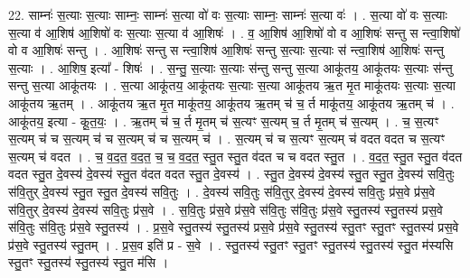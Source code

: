 \documentclass[17pt]{extarticle}
\begin{document}
22. साम्नः॑ स॒त्याः स॒त्याः साम्नः॒ साम्नः॑ स॒त्या वो॑ वः स॒त्याः साम्नः॒ साम्नः॑ स॒त्या वः॑ । . स॒त्या वो॑ वः स॒त्याः स॒त्या व॑ आ॒शिष॑ आ॒शिषो॑ वः स॒त्याः स॒त्या व॑ आ॒शिषः॑ । . व॒ आ॒शिष॑ आ॒शिषो॑ वो व आ॒शिषः॑ सन्तु स न्त्वा॒शिषो॑ वो व आ॒शिषः॑ सन्तु । . आ॒शिषः॑ सन्तु स न्त्वा॒शिष॑ आ॒शिषः॑ सन्तु स॒त्याः स॒त्याः स॑ न्त्वा॒शिष॑ आ॒शिषः॑ सन्तु स॒त्याः । . आ॒शिष॒ इत्या᳚ - शिषः॑ । . स॒न्तु॒ स॒त्याः स॒त्याः स॑न्तु सन्तु स॒त्या आकू॑तय॒ आकू॑तयः स॒त्याः स॑न्तु सन्तु स॒त्या आकू॑तयः । . स॒त्या आकू॑तय॒ आकू॑तयः स॒त्याः स॒त्या आकू॑तय ऋ॒त मृ॒त माकू॑तयः स॒त्याः स॒त्या आकू॑तय ऋ॒तम् । . आकू॑तय ऋ॒त मृ॒त माकू॑तय॒ आकू॑तय ऋ॒तम् च॑ च॒ र्त माकू॑तय॒ आकू॑तय ऋ॒तम् च॑ । . आकू॑तय॒ इत्या - कू॒त॒यः॒ । . ऋ॒तम् च॑ च॒ र्त मृ॒तम् च॑ स॒त्यꣳ स॒त्यम् च॒ र्त मृ॒तम् च॑ स॒त्यम् । . च॒ स॒त्यꣳ स॒त्यम् च॑ च स॒त्यम् च॑ च स॒त्यम् च॑ च स॒त्यम् च॑ । . स॒त्यम् च॑ च स॒त्यꣳ स॒त्यम् च॑ वदत वदत च स॒त्यꣳ स॒त्यम् च॑ वदत । . च॒ व॒द॒त॒ व॒द॒त॒ च॒ च॒ व॒द॒त॒ स्तु॒त स्तु॒त व॑दत च च वदत स्तु॒त । . व॒द॒त॒ स्तु॒त स्तु॒त व॑दत वदत स्तु॒त दे॒वस्य॑ दे॒वस्य॑ स्तु॒त व॑दत वदत स्तु॒त दे॒वस्य॑ । . स्तु॒त दे॒वस्य॑ दे॒वस्य॑ स्तु॒त स्तु॒त दे॒वस्य॑ सवि॒तुः स॑वि॒तुर् दे॒वस्य॑ स्तु॒त स्तु॒त दे॒वस्य॑ सवि॒तुः । . दे॒वस्य॑ सवि॒तुः स॑वि॒तुर् दे॒वस्य॑ दे॒वस्य॑ सवि॒तुः प्र॑स॒वे प्र॑स॒वे स॑वि॒तुर् दे॒वस्य॑ दे॒वस्य॑ सवि॒तुः प्र॑स॒वे । . स॒वि॒तुः प्र॑स॒वे प्र॑स॒वे स॑वि॒तुः स॑वि॒तुः प्र॑स॒वे स्तु॒तस्य॑ स्तु॒तस्य॑ प्रस॒वे स॑वि॒तुः स॑वि॒तुः प्र॑स॒वे स्तु॒तस्य॑ । . प्र॒स॒वे स्तु॒तस्य॑ स्तु॒तस्य॑ प्रस॒वे प्र॑स॒वे स्तु॒तस्य॑ स्तु॒तꣳ स्तु॒तꣳ स्तु॒तस्य॑ प्रस॒वे प्र॑स॒वे स्तु॒तस्य॑ स्तु॒तम् । . प्र॒स॒व इति॑ प्र - स॒वे । . स्तु॒तस्य॑ स्तु॒तꣳ स्तु॒तꣳ स्तु॒तस्य॑ स्तु॒तस्य॑ स्तु॒त म॑स्यसि स्तु॒तꣳ स्तु॒तस्य॑ स्तु॒तस्य॑ स्तु॒त म॑सि । \newline
\end{document}
